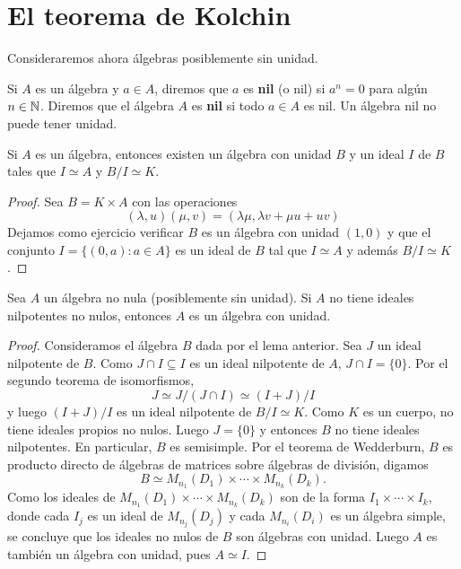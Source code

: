 \chapter{El teorema de Kolchin}


Consideraremos ahora álgebras posiblemente sin unidad. 

Si $A$ es un álgebra y $a\in A$, diremos que $a$ es \textbf{nil} (o nil) si 
$a^n=0$ para algún $n\in\mathbb{N}$. Diremos que el álgebra $A$ es \textbf{nil} si
todo $a\in A$ es nil.  Un álgebra nil no puede tener unidad. 

\begin{lemma}
Si $A$ es un álgebra, entonces existen un álgebra con unidad $B$ y un ideal $I$ 
de $B$ tales que $I\simeq A$ y $B/I\simeq K$.  
\end{lemma}

\begin{proof}
Sea $B=K\times A$ con las operaciones
\[
(\lambda,u)(\mu,v)=(\lambda\mu,\lambda v+\mu u+uv)
\]
Dejamos como ejercicio verificar $B$ es un álgebra
con unidad $(1,0)$ y que el conjunto 
$I=\{(0,a):a\in A\}$ es un ideal de $B$ 
tal que $I\simeq A$ y además $B/I\simeq K$. 
\end{proof}

\begin{proposition}
Sea $A$ un álgebra no nula (posiblemente sin unidad). Si $A$ no tiene ideales
nilpotentes no nulos, entonces $A$ es un álgebra con unidad. 
\end{proposition}

\begin{proof}
Consideramos el álgebra $B$ dada por el lema anterior. 
Sea $J$ un ideal nilpotente de $B$. Como $J\cap I\subseteq I$ es un ideal
nilpotente de $A$, $J\cap I=\{0\}$. Por el segundo teorema de isomorfismos,
\[
J\simeq J/(J\cap I)\simeq (I+J)/I
\]
y luego $(I+J)/I$ es un ideal nilpotente de $B/I\simeq K$. Como $K$ es un cuerpo,
no tiene ideales propios no nulos. Luego $J=\{0\}$ y entonces
$B$ no tiene ideales nilpotentes. En particular, $B$ es semisimple. Por el 
teorema de Wedderburn, $B$ es producto directo de álgebras de matrices
sobre álgebras de división,
digamos
\[
B\simeq M_{n_1}(D_1)\times\cdots\times M_{n_k}(D_k).
\]
Como los ideales de $M_{n_1}(D_1)\times\cdots\times M_{n_k}(D_k)$ 
son de la forma $I_1\times\cdots\times I_k$, donde cada $I_j$ es un ideal de $M_{n_j}(D_j)$ y  
cada $M_{n_i}(D_i)$ es un álgebra simple, se concluye que los ideales no nulos de $B$
son álgebras con unidad. Luego $A$ es también un álgebra con unidad,
pues $A\simeq I$.    
\end{proof}

